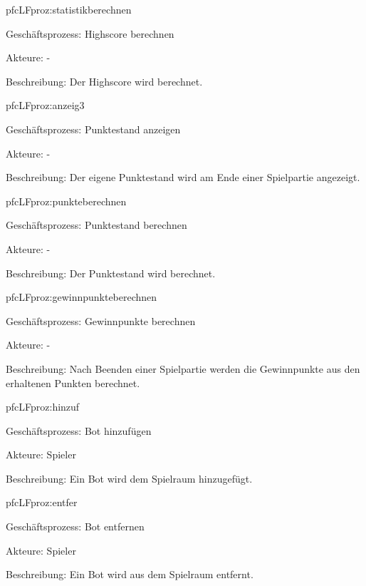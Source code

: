 \begin{description}[leftmargin=5em, style=sameline]
	\begin{lhp}{pfc}{LF}{proz:statistikberechnen}
		\item [Geschäftsprozess:] Highscore berechnen
		\item [Akteure:] -
		\item [Beschreibung:] Der Highscore wird berechnet.
	\end{lhp}
	
	\begin{lhp}{pfc}{LF}{proz:anzeig3}
		\item [Geschäftsprozess:] Punktestand anzeigen
		\item [Akteure:] -
		\item [Beschreibung:] Der eigene Punktestand wird am Ende einer Spielpartie angezeigt.
	\end{lhp}

	\begin{lhp}{pfc}{LF}{proz:punkteberechnen}
		\item [Geschäftsprozess:] Punktestand berechnen
		\item [Akteure:] -
		\item [Beschreibung:] Der Punktestand wird berechnet.
	\end{lhp}
	
	\begin{lhp}{pfc}{LF}{proz:gewinnpunkteberechnen}
		\item [Geschäftsprozess:] Gewinnpunkte berechnen
		\item [Akteure:] - 
		\item [Beschreibung:] Nach Beenden einer Spielpartie werden die Gewinnpunkte aus den erhaltenen Punkten berechnet.
	\end{lhp}
	
	\begin{lhp}{pfc}{LF}{proz:hinzuf}
		\item [Geschäftsprozess:] Bot hinzufügen
		\item [Akteure:] Spieler
		\item [Beschreibung:] Ein Bot wird dem Spielraum hinzugefügt.
	\end{lhp}
	
	\begin{lhp}{pfc}{LF}{proz:entfer}
		\item [Geschäftsprozess:] Bot entfernen
		\item [Akteure:] Spieler
		\item [Beschreibung:] Ein Bot wird aus dem Spielraum entfernt.
	\end{lhp}
	

\end{description}
